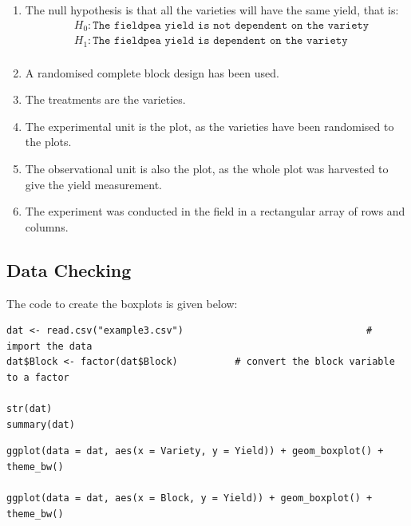 \documentclass[a4paper, 10pt, fleqn, twosided]{memoir}
\begin{document}
\begin{enumerate}
\item The null hypothesis is that all the varieties will have the same yield, that is:
\begin{align*}
& H_0: \texttt{The fieldpea yield is not dependent on the variety}\\
& H_1:\texttt{The fieldpea yield is dependent on the variety}\\
\end{align*}
\item A randomised complete block design has been used. \\
\item The treatments are the varieties.\\
\item The experimental unit is the plot, as the varieties have been randomised to the plots.\\
\item The observational unit is also the plot, as the whole plot was harvested to give the yield measurement.\\
\item The experiment was conducted in the field in a rectangular array of rows and columns.\\
\end{enumerate}


\subsection{Data Checking}
The code to create the boxplots is given below:

\begin{tcolorbox}[title = Import and graph the data]
\begin{verbatim}
dat <- read.csv("example3.csv")                                # import the data
dat$Block <- factor(dat$Block)          # convert the block variable to a factor

str(dat)
summary(dat)
\end{verbatim}
\tcblower
\begin{verbatim}
ggplot(data = dat, aes(x = Variety, y = Yield)) + geom_boxplot() +
theme_bw()

ggplot(data = dat, aes(x = Block, y = Yield)) + geom_boxplot() +
theme_bw()

\end{verbatim}
\end{tcolorbox}
\end{document}
